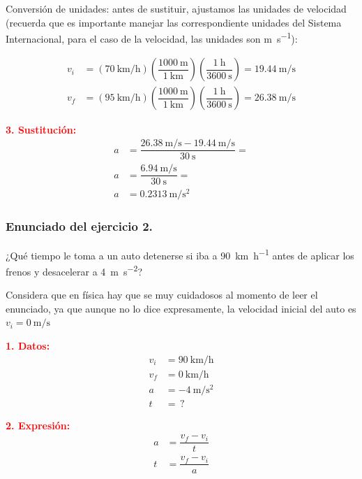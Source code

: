 \documentclass[14pt]{extarticle}
\newcommand{\textocolor}[2]{\textbf{\textcolor{#1}{#2}}}
\begin{document}
\vspace*{0.3cm}
Conversión de unidades: antes de sustituir, ajustamos las unidades de velocidad (recuerda que es importante manejar las correspondiente unidades del Sistema Internacional, para el caso de la velocidad, las unidades son \unit{\meter\per\second}):

\begin{align*}
v_{i} &= \left( \SI[per-mode=fraction]{70}{\kilo\meter\per\hour} \right)  \left( \dfrac{\SI{1000}{\meter}}{\SI{1}{\kilo\meter}} \right)  \left( \dfrac{\SI{1}{\hour}}{\SI{3600}{\second}} \right) = \SI[per-mode=fraction]{19.44}{\meter\per\second} \\[0.5em] 
v_{f} &= \left( \SI[per-mode=fraction]{95}{\kilo\meter\per\hour} \right)  \left( \dfrac{\SI{1000}{\meter}}{\SI{1}{\kilo\meter}} \right)  \left( \dfrac{\SI{1}{\hour}}{\SI{3600}{\second}} \right) = \SI[per-mode=fraction]{26.38}{\meter\per\second}
\end{align*}

\textocolor{red}{3. Sustitución:}
\begin{align*}
a &= \dfrac{ \displaystyle \SI[per-mode=fraction]{26.38}{\meter\per\second} - \SI[per-mode=fraction]{19.44}{\meter\per\second}}{\SI{30}{\second}} = \\[0.5em] 
a &= \dfrac{ \displaystyle \SI[per-mode=fraction]{6.94}{\meter\per\second}}{\SI{30}{\second}} = \\[0.5em] 
a &= \SI{0.2313}{\meter\per\square\second}
\end{align*}

\subsubsection{Enunciado del ejercicio 2.}

¿Qué tiempo le toma a un auto detenerse si iba a \SI{90}{\kilo\meter\per\hour} antes de aplicar los frenos y desacelerar a \SI{4}{\meter\per\square\second}?

Considera que en física hay que se muy cuidadosos al momento de leer el enunciado, ya que aunque no lo dice expresamente, la velocidad inicial del auto es $v_{i} = \SI{0}{\meter\per\second}$

\vspace{0.3cm}
\begin{minipage}[t]{0.4\linewidth}
\textocolor{red}{1. Datos:}
\begin{align*}
v_{i} &= \SI{90}{\kilo\meter\per\hour} \\[0.5em] 
v_{f} &= \SI{0}{\kilo\meter\per\hour} \\[0.5em] 
a &= - \SI{4}{\meter\per\square\second} \\[0.5em] 
t &= \, ?
\end{align*}
\end{minipage}
\hspace{0.5cm}
\begin{minipage}[t]{0.4\linewidth}
\textocolor{red}{2. Expresión:}
\begin{align*}
a &= \dfrac{v_{f} - v_{i}}{t} \\[0.5em] 
t &=  \dfrac{v_{f} - v_{i}}{a}
\end{align*}
\end{minipage}
\end{document}

